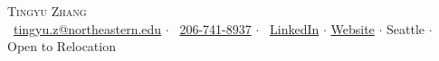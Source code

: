 \documentclass{resume}
\begin{document}
\begin{center}
    {\Huge \textsc{Tingyu Zhang}} \\[4pt]
    \faEnvelope\ \href{mailto:tingyu.z@northeastern.edu}{tingyu.z@northeastern.edu} $\cdot$
    \faPhone\ \href{tel:206-741-8937}{206-741-8937} $\cdot$
    \faLinkedin\ \href{https://www.linkedin.com/in/tingyu-zhang-424065388}{LinkedIn} $\cdot$
    \faGlobe\href{https://panreta.github.io/}{Website} $\cdot$
    Seattle $\cdot$ Open to Relocation
\end{center}

\vspace{-12pt}

\vspace{-18pt}

\vspace{-18pt}

\vspace{-15pt}

\vspace{-18pt}


% 
\end{document}
